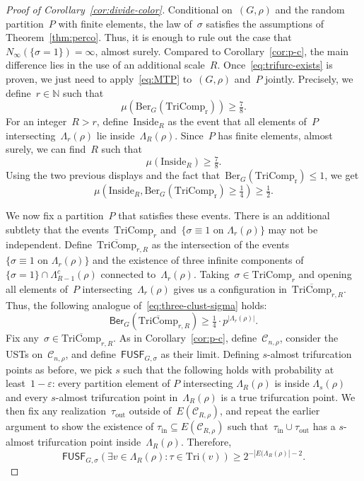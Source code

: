 \documentclass[11pt,letterpaper]{amsart}
\newcounter{n}
\numberwithin{n}{section}
\theoremstyle{plain}
\theoremstyle{definition}
\theoremstyle{remark}
\newcommand\N{\mathbb N}
\newcommand\calC{\mathcal C}
\newcommand{\1}{\mathbbm{1}}
\begin{document}
\begin{proof}[Proof of Corollary~\ref{cor:divide-color}]
	Conditional on~$(G,\rho)$ and the random partition~$P$ with finite elements, the law of~$\sigma$ satisfies the assumptions of Theorem~\ref{thm:perco}.
	Thus, it is enough to rule out the case that~$N_\infty(\{\sigma=1\}) = \infty$, almost surely.
	Compared to Corollary~\ref{cor:p-c}, the main difference lies in the use of an additional scale~$R$.
	Once~\eqref{eq:trifurc-exists} is proven, we just need to apply~\eqref{eq:MTP} to~$(G,\rho)$ and~$P$ jointly.
	Precisely, we define~$r\in\N$ such that
	\[
		\mu(\mathrm{Ber}_G(\mathrm{TriComp_r}))\geq \tfrac78.
	\]
	For an integer~$R>r$, define~$\mathrm{Inside}_R$ as the event that all elements of~$P$ intersecting~$\Lambda_r(\rho)$ lie inside~$\Lambda_R(\rho)$.
	Since~$P$ has finite elements, almost surely, we can find~$R$ such that
	\[
		\mu(\mathrm{Inside}_R) \geq \tfrac78.
	\]
	Using the two previous displays and the fact that~$\mathrm{Ber}_G(\mathrm{TriComp_r})\leq 1$, we get
	\[
		\mu(\mathrm{Inside}_R, \mathrm{Ber}_G(\mathrm{TriComp_r})\geq \tfrac14) \geq \tfrac12.
	\]

	We now fix a partition~$P$ that satisfies these events.
	There is an additional subtlety that the events~$\mathrm{TriComp}_r$ and~$\{\sigma \equiv 1 \text{ on } \Lambda_r(\rho)\}$ may not be independent.
	Define~$\overline{\mathrm{TriComp}}_{r,R}$ as the intersection of the events~$\{\sigma \equiv 1 \text{ on } \Lambda_r(\rho)\}$ and the existence of three infinite components of~$\{\sigma=1\}\cap \Lambda_{R-1}^c(\rho)$ connected to~$\Lambda_r(\rho)$.
	Taking~$\sigma\in \mathrm{TriComp}_r$ and opening all elements of~$P$ intersecting~$\Lambda_r(\rho)$ gives us a configuration in~$\overline{\mathrm{TriComp}}_{r,R}$.
	Thus, the following analogue of~\eqref{eq:three-clust-sigma} holds:
	\[
		\mathsf{Ber}_G(\overline{\mathrm{TriComp}}_{r,R}) \geq \tfrac14\cdot p^{|\Lambda_r(\rho)|}.
	\]
	Fix any~$\sigma\in \overline{\mathrm{TriComp}}_{r,R}$.
	As in Corollary~\ref{cor:p-c}, define~$\calC_{n,\rho}$, consider the USTs on~$\calC_{n,\rho}$, and define~$\mathsf{FUSF}_{G,\sigma}$ as their limit.
	Defining $s$-almost trifurcation points as before, we pick $s$ such that the following holds with probability at least~$1-\varepsilon$: every partition element of $P$ intersecting $\Lambda_R(\rho)$ is inside $\Lambda_s(\rho)$ and every $s$-almost trifurcation point in~$\Lambda_R(\rho)$ is a true trifurcation point.  We then fix any realization~$\tau_{\mathrm{out}}$ outside of~$E(\calC_{R,\rho})$, and repeat the earlier argument to show the existence of $\tau_\mathrm{in}\subseteq E(\calC_{R,\rho})$ such that~$\tau_\mathrm{in}\cup \tau_\mathrm{out}$ has a $s$-almost trifurcation point inside~$\Lambda_R(\rho)$.  Therefore,
	\[
		\mathsf{FUSF}_{G,\sigma}(\exists v\in \Lambda_R(\rho) \colon \tau\in \mathrm{Tri}(v)) \geq 2^{-|E(\Lambda_R(\rho)|-2}.
	\]
	

\end{proof}
\end{document}
